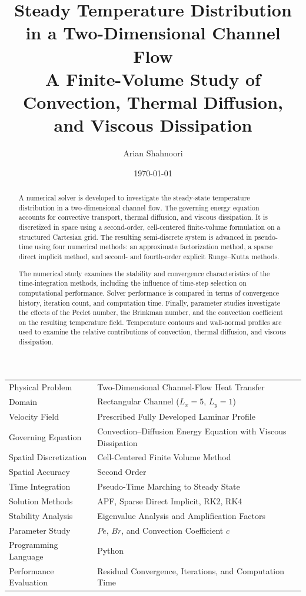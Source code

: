 \documentclass[11pt,a4paper]{article}
\title{
    \Huge\textbf{Steady Temperature Distribution in a Two-Dimensional Channel Flow}\\[0.4cm]
    \Large
    A Finite-Volume Study of Convection, Thermal Diffusion, and Viscous Dissipation
}
\author{
    \Large Arian Shahnoori
}
\date{\today}
\begin{document}

\maketitle
\thispagestyle{empty}

\vspace{-1cm}

\begin{abstract}
A numerical solver is developed to investigate the steady-state temperature
distribution in a two-dimensional channel flow. The governing energy equation
accounts for convective transport, thermal diffusion, and viscous dissipation.
It is discretized in space using a second-order, cell-centered finite-volume
formulation on a structured Cartesian grid. The resulting semi-discrete
system is advanced in pseudo-time using four numerical methods: an
approximate factorization method, a sparse direct implicit method, and
second- and fourth-order explicit Runge--Kutta methods.

The numerical study examines the stability and convergence characteristics
of the time-integration methods, including the influence of time-step
selection on computational performance. Solver performance is compared
in terms of convergence history, iteration count, and computation time.
Finally, parameter studies investigate the effects of the Peclet number,
the Brinkman number, and the convection coefficient on the resulting
temperature field. Temperature contours and wall-normal profiles are
used to examine the relative contributions of convection, thermal
diffusion, and viscous dissipation.
\end{abstract}

\vspace{0.5cm}

\begin{center}
\begin{tabular}{ll}
\toprule
Physical Problem & Two-Dimensional Channel-Flow Heat Transfer \\
Domain & Rectangular Channel ($L_x=5$, $L_y=1$) \\
Velocity Field & Prescribed Fully Developed Laminar Profile \\
Governing Equation & Convection--Diffusion Energy Equation with Viscous Dissipation \\
Spatial Discretization & Cell-Centered Finite Volume Method \\
Spatial Accuracy & Second Order \\
Time Integration & Pseudo-Time Marching to Steady State \\
Solution Methods & APF, Sparse Direct Implicit, RK2, RK4 \\
Stability Analysis & Eigenvalue Analysis and Amplification Factors \\
Parameter Study & $Pe$, $Br$, and Convection Coefficient $c$ \\
Programming Language & Python \\
Performance Evaluation & Residual Convergence, Iterations, and Computation Time \\
\bottomrule
\end{tabular}
\end{center}
\end{document}
